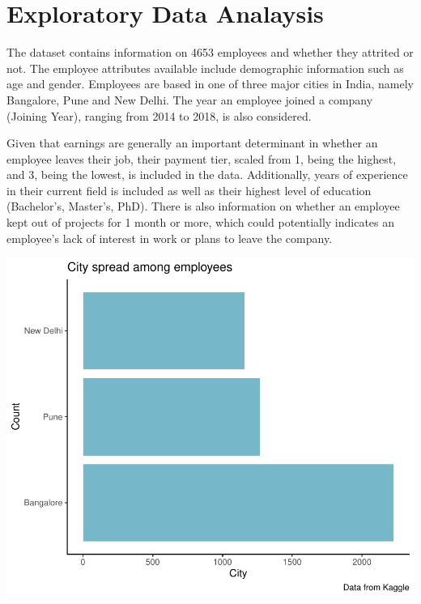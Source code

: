 \documentclass[11pt,preprint, authoryear]{elsarticle}
\numberwithin{equation}{section}
\numberwithin{figure}{section}
\numberwithin{table}{section}
\begin{document}
\hypertarget{exploratory-data-analaysis}{%
\section*{Exploratory Data Analaysis}\label{exploratory-data-analaysis}}

The dataset contains information on 4653 employees and whether they
attrited or not. The employee attributes available include demographic
information such as age and gender. Employees are based in one of three
major cities in India, namely Bangalore, Pune and New Delhi. The year an
employee joined a company (Joining Year), ranging from 2014 to 2018, is
also considered.

Given that earnings are generally an important determinant in whether an
employee leaves their job, their payment tier, scaled from 1, being the
highest, and 3, being the lowest, is included in the data. Additionally,
years of experience in their current field is included as well as their
highest level of education (Bachelor's, Master's, PhD). There is also
information on whether an employee kept out of projects for 1 month or
more, which could potentially indicates an employee's lack of interest
in work or plans to leave the company.

\includegraphics{Final_project_files/figure-latex/unnamed-chunk-2-1.pdf}
\end{document}
